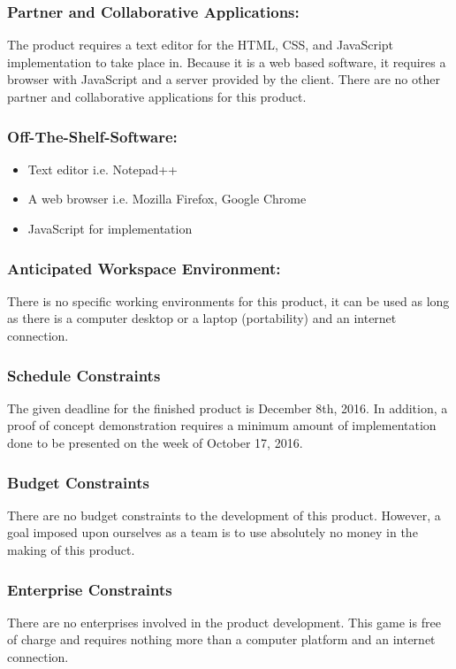 \documentclass[12pt, titlepage]{article}
\begin{document}
\subsubsection{Partner and Collaborative Applications:} 
The product requires a
text editor for the HTML, CSS, and JavaScript implementation to take place in.
Because it is a web based software, it requires a browser with JavaScript and a
server provided by the client. There are no other partner and collaborative
applications for this product.
\subsubsection {Off-The-Shelf-Software:}
\begin{itemize}
\item Text editor i.e. Notepad++
\item A web browser i.e. Mozilla Firefox, Google Chrome
\item JavaScript for implementation
\end{itemize}
\subsubsection{Anticipated Workspace Environment:} 
There is no specific working
environments for this product, it can be used as long as there is a computer
desktop or a laptop (portability) and an internet connection.
\subsubsection{Schedule Constraints} 
The given deadline for the finished
product is December 8th, 2016. In addition, a proof of concept demonstration
requires a minimum amount of implementation done to be presented on the week of
October 17, 2016.
\subsubsection{Budget Constraints} 
There are no budget constraints to the
development of this product. However, a goal imposed upon ourselves as a team is
to use absolutely no money in the making of this product.
\subsubsection{Enterprise Constraints} 
There are no enterprises involved in the
product development. This game is free of charge and requires nothing more than
a computer platform and an internet connection.
\end{document}
